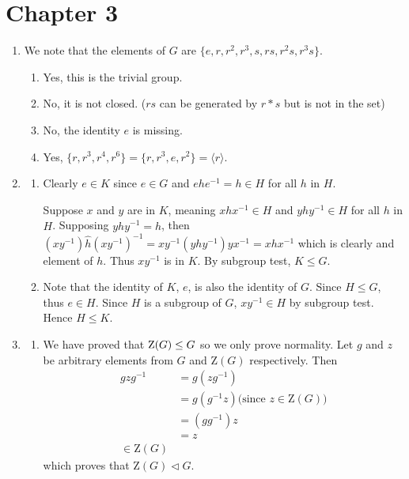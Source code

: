 \section*{Chapter 3}
\begin{enumerate}
    \item We note that the elements of $G$ are $\{e, r, r^2, r^3, s, rs, r^2s, r^3s\}$.
    \begin{enumerate}[label=(\alph*)]
        \item Yes, this is the trivial group.
        \item No, it is not closed. ($rs$ can be generated by $r \ast s$ but is not in the set)
        \item No, the identity $e$ is missing.
        \item Yes, $\{r, r^3, r^4, r^6\} = \{r, r^3, e, r^2\} = \langle r \rangle$.
    \end{enumerate}

    \item \begin{enumerate}[label=(\alph*)]
        \item Clearly $e \in K$ since $e \in G$ and $ehe^{-1} = h \in H$ for all $h$ in $H$.

        Suppose $x$ and $y$ are in $K$, meaning $xhx^{-1} \in H$ and $yhy^{-1} \in H$ for all $h$ in $H$. Supposing $yhy^{-1} = \hat{h}$, then $(xy^{-1})\hat{h}(xy^{-1})^{-1} = xy^{-1}\left(yhy^{-1}\right)yx^{-1} = xhx^{-1}$ which is clearly and element of $h$. Thus $xy^{-1}$ is in $K$. By subgroup test, $K \leq G$.

        \item Note that the identity of $K$, $e$, is also the identity of $G$. Since $H \leq G$, thus $e \in H$. Since $H$ is a subgroup of $G$, $xy^{-1} \in H$ by subgroup test. Hence $H \leq K$.
    \end{enumerate}

    \item \begin{enumerate}[label=(\alph*)]
        \item We have proved that $\mathrm{Z}(G) \leq G$ so we only prove normality. Let $g$ and $z$ be arbitrary elements from $G$ and $\mathrm{Z}(G)$ respectively. Then
        \begin{align*}
            gzg^{-1} &= g(zg^{-1})\\
            &= g(g^{-1}z) \text{(since }z \in \mathrm{Z}(G))\\
            &= (gg^{-1})z \\
            &= z\\
            \in \mathrm{Z}(G)
        \end{align*}
        which proves that $\mathrm{Z}(G) \lhd G$.


\end{enumerate}
\end{enumerate}
